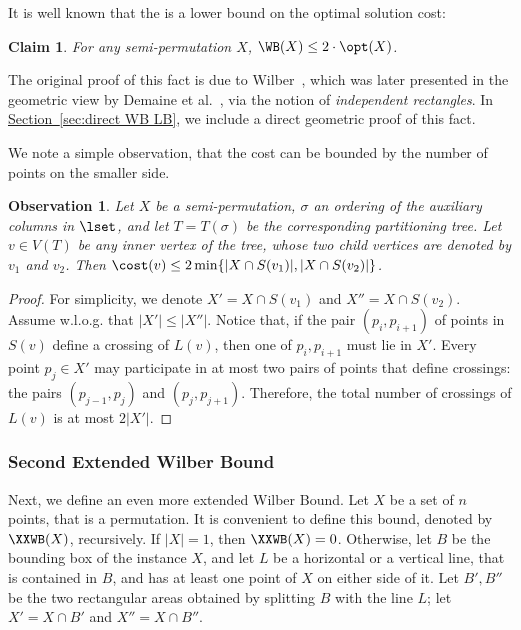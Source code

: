 \documentclass[11pt]{article}
\numberwithin{equation}{section}
\newtheorem{claim}[theorem]{Claim}
\theoremstyle{definition}
\theoremstyle{plain}
\newcommand{\expref}[2]{\hyperref[#2]{#1~\ref{#2}}}
\newtheorem{myobs}[theorem]{Observation}
\begin{document}
It is well known that the \WBone is a lower bound on the optimal solution cost:

\begin{claim}\label{claim: bounding WB by OPT}
	For any semi-permutation $X$, $\WB(X)\leq 2 \cdot \opt(X)$.
\end{claim} 

The original proof of this fact is due to Wilber~\cite{wilber}, which was later presented in the geometric view by Demaine et al.~\cite{DHIKP09}, via the notion of \emph{independent rectangles}. In \expref{Section}{sec:direct WB LB}, we include a direct geometric proof of this fact. 

We note a simple observation, that the cost can be bounded by the number of points on the smaller side.
 
\begin{myobs}\label{obs: number of crossings at most min of both sides}
	Let $X$ be a semi-permutation, $\sigma$ an ordering of the auxiliary columns in $\lset$, and let $T=T({\sigma})$ be the corresponding partitioning tree. Let $v\in V(T)$ be any inner vertex of the tree, whose two child vertices are denoted by $v_1$ and $v_2$. 
Then $\cost(v) \leq 2 \min \{|X \cap S(v_1)|, |X \cap S(v_2)| \}$. 
\end{myobs}
\begin{proof}
For simplicity, we denote $X' =  X \cap S(v_1)$ and $X'' = X \cap S(v_2)$. 
Assume w.l.o.g. that $|X'|\leq |X''|$. Notice that, if the pair $(p_i,p_{i+1})$ of points in $S(v)$ define a crossing of $L(v)$, then one of $p_i,p_{i+1}$ must lie in $X'$. 
Every point $p_j\in X'$ may participate in at most two pairs of points that define crossings: the pairs $(p_{j-1},p_j)$ and $(p_j,p_{j+1})$. 
Therefore, the total number of crossings of $L(v)$ is at most $2|X'|$.
\end{proof}



%

%
%
%
%
%
%
%











\iffalse 
\subsubsection{Second Extended Wilber Bound}
Next, we define an even more extended Wilber Bound. Let $X$ be a set of $n$ points, that is a permutation. It is convenient to define this bound, denoted by $\XXWB(X)$, recursively. If $|X|=1$, then $\XXWB(X)=0$. Otherwise, let $B$ be the bounding box of the instance $X$, and let $L$ be a horizontal or a vertical line, that is contained in $B$, and has at least one point of $X$ on either side of it. Let $B',B''$ be the two rectangular areas obtained by splitting $B$ with the line $L$; let $X'=X\cap B'$ and $X''=X\cap B''$.
\end{document}
